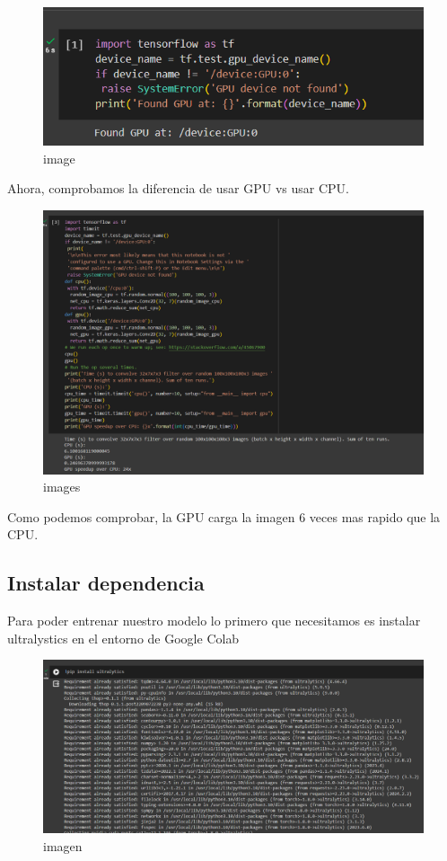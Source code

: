 \documentclass[11pt]{article}
\begin{document}
    \begin{figure}
\centering
\includegraphics{imgs/Comprobamos que usa la GPU.png}
\caption{image}
\end{figure}

    Ahora, comprobamos la diferencia de usar GPU vs usar CPU.

    \begin{figure}
\centering
\includegraphics{imgs/Comprobamos que lee las imagenes mas rapido.png}
\caption{images}
\end{figure}

    Como podemos comprobar, la GPU carga la imagen 6 veces mas rapido que la
CPU.

    \subsection{Instalar dependencia}\label{instalar-dependencia}

    Para poder entrenar nuestro modelo lo primero que necesitamos es
instalar ultralystics en el entorno de Google Colab

    \begin{figure}
\centering
\includegraphics{imgs/Instalamos Ultralystics.png}
\caption{imagen}
\end{figure}
\end{document}
